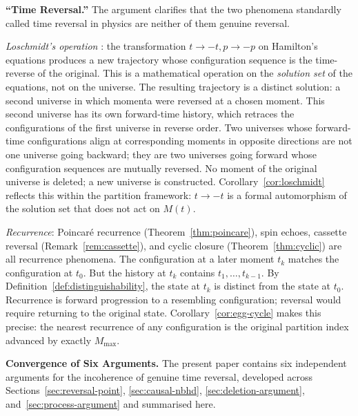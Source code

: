 \documentclass[twocolumn,10pt,a4paper]{article}
\theoremstyle{thmstyle}
\theoremstyle{definition}
\theoremstyle{remark}
\newcommand{\Mmax}{M_{\max}}
\begin{document}
\textbf{``Time Reversal.''}
The argument clarifies that the two phenomena standardly called time reversal in physics are neither of them genuine reversal.

\emph{Loschmidt's operation} \citep{loschmidt1876,loschmidt1877}: the transformation $t \to -t, p \to -p$ on Hamilton's equations produces a new trajectory whose configuration sequence is the time-reverse of the original. This is a mathematical operation on the \emph{solution set} of the equations, not on the universe. The resulting trajectory is a distinct solution: a second universe in which momenta were reversed at a chosen moment. This second universe has its own forward-time history, which retraces the configurations of the first universe in reverse order. Two universes whose forward-time configurations align at corresponding moments in opposite directions are not one universe going backward; they are two universes going forward whose configuration sequences are mutually reversed. No moment of the original universe is deleted; a new universe is constructed. Corollary~\ref{cor:loschmidt} reflects this within the partition framework: $t \to -t$ is a formal automorphism of the solution set that does not act on $M(t)$.

\emph{Recurrence}: Poincar\'e recurrence (Theorem~\ref{thm:poincare}), spin echoes, cassette reversal (Remark~\ref{rem:cassette}), and cyclic closure (Theorem~\ref{thm:cyclic}) are all recurrence phenomena. The configuration at a later moment $t_k$ matches the configuration at $t_0$. But the history at $t_k$ contains $t_1, \ldots, t_{k-1}$. By Definition~\ref{def:distinguishability}, the state at $t_k$ is distinct from the state at $t_0$. Recurrence is forward progression to a resembling configuration; reversal would require returning to the original state. Corollary~\ref{cor:egg-cycle} makes this precise: the nearest recurrence of any configuration is the original partition index advanced by exactly $\Mmax$.

\textbf{Convergence of Six Arguments.}
The present paper contains six independent arguments for the incoherence of genuine time reversal, developed across Sections~\ref{sec:reversal-point}, \ref{sec:causal-nbhd}, \ref{sec:deletion-argument}, and~\ref{sec:process-argument} and summarised here.
\end{document}
